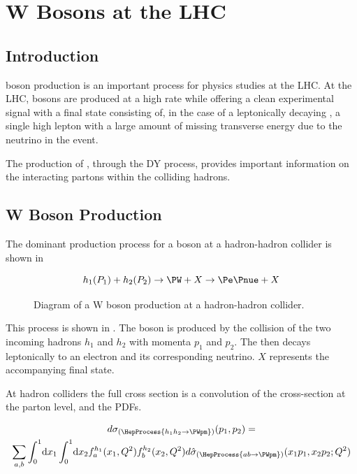 \chapter[W Bosons]{W Bosons at the LHC}

\section{Introduction}

\PW boson production is an important process for physics studies at the LHC.  At
the \ac{LHC}, \PW bosons are produced at a high rate while offering a clean
experimental signal with a final state consisting of, in the case of a
leptonically decaying \PW, a single high \PT lepton with a large amount of
missing transverse energy due to the neutrino in the event. 

The production of \PW, through the \ac{DY} process, provides important
information on the interacting partons within the colliding hadrons.

\section{W Boson Production}

The dominant production process for a \PW boson at a hadron-hadron collider is
shown in 

\begin{equation}
  h_1(P_1) + h_2(P_2)
  \to 
  \PW + X
  \to
  \Pe \Pnue + X
  \label{wbos:wprod}
\end{equation}

\begin{figure}[htb]
  \centering
  \caption{Diagram of a W boson production at a hadron-hadron collider.}
  \label{wbos:wproddiag}
\end{figure}

This process is shown in . 
The \PW boson is produced by the collision of the two incoming hadrons $h_1$
and $h_2$ with momenta $p_1$ and $p_2$. The \PW then decays leptonically to an
electron and its corresponding neutrino. $X$ represents the accompanying final
state.

At hadron colliders the full cross section is a convolution of the cross-section
at the parton level, and the \acp{PDF}.

\begin{multline}
  d\sigma_{(\HepProcess{h_1 h_2 \to \PWpm})}(p_1,p_2) = \\
  \sum\limits_{a,b}
  \int_0^1 \! \mathrm{d} x_1 
  \int_0^1 \! \mathrm{d} x_2 
  f_a^{h_1}(x_1,Q^2)
  f_b^{h_2}(x_2,Q^2) 
  d\hat{\sigma}_{(\HepProcess{a b \to \PWpm})}(x_1 p_1, x_2 p_2; Q^2)
  \label{wbos:xsec}
\end{multline}

